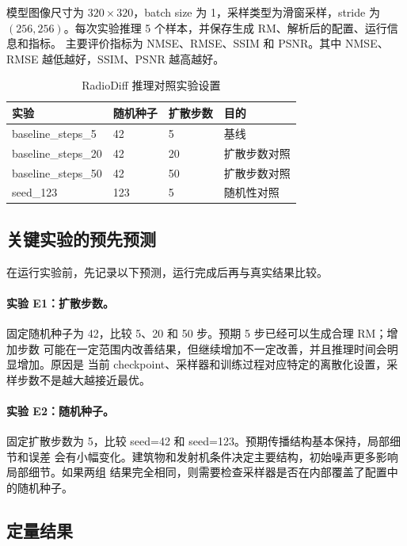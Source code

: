 模型图像尺寸为 $320\times320$，batch size 为 1，采样类型为滑窗采样，stride 为
$(256,256)$。每次实验推理 5 个样本，并保存生成 RM、解析后的配置、运行信息和指标。
主要评价指标为 NMSE、RMSE、SSIM 和 PSNR。其中 NMSE、RMSE 越低越好，SSIM、PSNR 越高越好。

\begin{table}[htbp]
  \centering
  \caption{RadioDiff 推理对照实验设置}
  \label{tab:exp-settings}
  \begin{tabular}{llll}
    \toprule
    实验 & 随机种子 & 扩散步数 & 目的 \\
    \midrule
    baseline\_steps\_5 & 42 & 5 & 基线 \\
    baseline\_steps\_20 & 42 & 20 & 扩散步数对照 \\
    baseline\_steps\_50 & 42 & 50 & 扩散步数对照 \\
    seed\_123 & 123 & 5 & 随机性对照 \\
    \bottomrule
  \end{tabular}
\end{table}

\subsection{关键实验的预先预测}

在运行实验前，先记录以下预测，运行完成后再与真实结果比较。

\paragraph{实验 E1：扩散步数。}
固定随机种子为 42，比较 5、20 和 50 步。预期 5 步已经可以生成合理 RM；增加步数
可能在一定范围内改善结果，但继续增加不一定改善，并且推理时间会明显增加。原因是
当前 checkpoint、采样器和训练过程对应特定的离散化设置，采样步数不是越大越接近最优。

\paragraph{实验 E2：随机种子。}
固定扩散步数为 5，比较 seed=42 和 seed=123。预期传播结构基本保持，局部细节和误差
会有小幅变化。建筑物和发射机条件决定主要结构，初始噪声更多影响局部细节。如果两组
结果完全相同，则需要检查采样器是否在内部覆盖了配置中的随机种子。

\subsection{定量结果}

